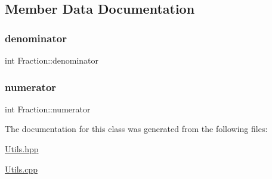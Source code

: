 \subsection{Member Data Documentation}
\hypertarget{class_fraction_a079acff7892d39be395f14799244d044}{}\label{class_fraction_a079acff7892d39be395f14799244d044} 
\subsubsection{\texorpdfstring{denominator}{denominator}}
{\footnotesize\ttfamily int Fraction\+::denominator\hspace{0.3cm}{\ttfamily [private]}}

\hypertarget{class_fraction_a447e179720bd927a19c1d73fb040d1c4}{}\label{class_fraction_a447e179720bd927a19c1d73fb040d1c4} 
\subsubsection{\texorpdfstring{numerator}{numerator}}
{\footnotesize\ttfamily int Fraction\+::numerator\hspace{0.3cm}{\ttfamily [private]}}



The documentation for this class was generated from the following files\+:\begin{DoxyCompactItemize}
\item 
\hyperlink{_utils_8hpp}{Utils.\+hpp}\item 
\hyperlink{_utils_8cpp}{Utils.\+cpp}\end{DoxyCompactItemize}
